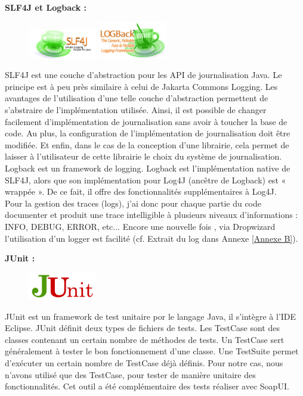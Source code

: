 \begin{itemize}
\textbf{SLF4J et Logback :} 

\begin{figure}
\centering
\includegraphics[width=3cm]{images/slf4j-logo.jpg}
\includegraphics[width=3cm]{images/lblogo.jpg}
\end{figure}
\noindent SLF4J est une couche d'abstraction pour les API de journalisation Java. Le principe est à peu près similaire à celui de Jakarta Commons Logging. Les avantages de l'utilisation d'une telle couche d'abstraction permettent de s'abstraire de l'implémentation utilisée. Ainsi, il est possible de changer facilement d'implémentation de journalisation sans avoir à toucher la base de code. Au plus, la configuration de l'implémentation de journalisation doit être modifiée. Et enfin, dans le cas de la conception d'une librairie, cela permet de laisser à l'utilisateur de cette librairie le choix du système de journalisation.\\
Logback est un framework de logging. Logback est l'implémentation native de SLF4J, alors que son implémentation pour Log4J (ancêtre de Logback) est « wrappée ». De ce fait, il offre des fonctionnalités supplémentaires à Log4J.\\
Pour la gestion des traces (logs), j'ai donc pour chaque partie du code documenter et produit une trace intelligible à plusieurs niveaux d'informations : INFO, DEBUG, ERROR, etc... Encore une nouvelle fois , via Dropwizard l'utilisation d'un logger est facilité (cf. Extrait du log dans Annexe \ref{Annexe B}).

\textbf{JUnit :} 

\begin{figure}
\centering
\includegraphics[width=3cm]{images/junit-logo.png}
\end{figure}
\noindent JUnit est un framework de test unitaire por le langage Java, il s'intègre à l'IDE Eclipse. JUnit définit deux types de fichiers de tests. Les TestCase sont des classes contenant un certain nombre de méthodes de tests. Un TestCase sert généralement à tester le bon fonctionnement d'une classe. Une TestSuite permet d'exécuter un certain nombre de TestCase déjà définis. Pour notre cas, nous n'avons utilisé que des TestCase, pour tester de manière unitaire des fonctionnalités. Cet outil a été complémentaire des tests réaliser avec SoapUI.



\end{itemize}
